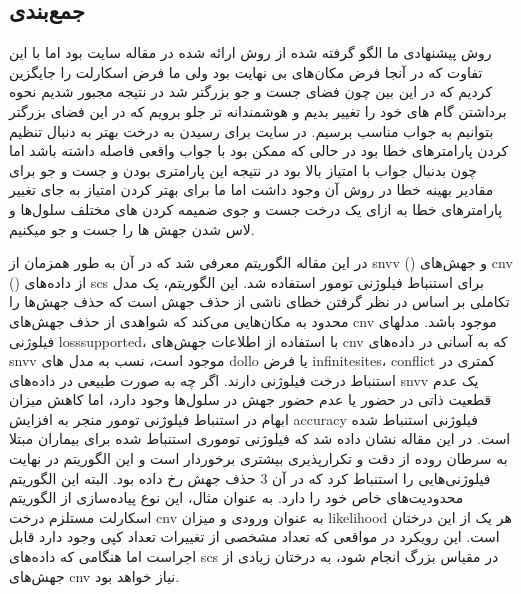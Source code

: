 \subsection{جمع‌بندی}
روش پیشنهادی ما الگو گرفته شده از روش ارائه شده در مقاله سایت بود اما با این تفاوت که در آنجا فرض مکان‌های بی نهایت بود ولی ما فرض اسکارلت را جایگزین کردیم که در این بین چون فضای جست و جو بزرگتر شد در نتیجه مجبور شدیم نحوه برداشتن گام های خود را تغییر بدیم و هوشمندانه تر جلو برویم که در این فضای بزرگتر بتوانیم به جواب مناسب برسیم. در سایت برای رسیدن به درخت بهتر به دنبال تنظیم کردن پارامترهای خطا بود در حالی که ممکن بود با جواب واقعی فاصله داشته باشد اما چون بدنبال جواب با امتیاز بالا بود در نتیجه این پارامتری بودن و جست و جو برای مقادیر بهینه خطا در روش آن وجود داشت اما ما برای بهتر کردن امتیاز به جای تغییر پارامترهای خطا به ازای یک درخت جست و جوی ضمیمه کردن های مختلف سلول‌ها و لاس شدن جهش ها را جست و جو میکنیم.









\newpage

در این مقاله الگوریتم  معرفی شد که در آن به طور همزمان از \gls{snvv} () و جهش‌های \gls{cnv} () از داده‌های \gls{scs} برای استنباط فیلوژنی تومور استفاده شد. این الگوریتم، یک مدل تکاملی بر اساس در نظر گرفتن خطای ناشی از حذف جهش است که حذف جهش‌ها را محدود به مکان‌هایی می‌کند که شواهدی از حذف جهش‌های \gls{cnv} موجود باشد. مدلهای فیلوژنی \gls{losssupported}،  با استفاده از اطلاعات جهش‌های \gls{cnv} که به آسانی در داده‌های \gls{snvv} موجود است، نسب به مدل های \gls{dollo} یا فرض \gls{infinitesites}، \gls{conflict} کمتری در استنباط درخت فیلوژنی دارند. اگر چه به صورت طبیعی در داده‌های \gls{snvv} یک عدم قطعیت ذاتی در حضور یا عدم حضور جهش در سلول‌ها وجود دارد، اما کاهش میزان ابهام در استنباط فیلوژنی تومور منجر به افزایش \gls{accuracy} فیلوژنی استنباط شده است. در این مقاله نشان داده شد که فیلوژنی توموری استنباط شده برای بیماران مبتلا به سرطان روده از دقت و تکرارپذیری بیشتری برخوردار است و این الگوریتم در نهایت فیلوژنی‌هایی را استنباط کرد که در آن 3 حذف جهش رخ داده بود. البته این الگوریتم محدودیت‌های خاص خود را دارد. به عنوان مثال، این نوع پیاده‌سازی از الگوریتم اسکارلت مستلزم درخت \gls{cnv} به عنوان ورودی و میزان \gls{likelihood} هر یک از این درختان است. این رویکرد در مواقعی که تعداد مشخصی از تغییرات تعداد کپی وجود دارد قابل اجراست اما هنگامی که داده‌های \gls{scs} در مقیاس بزرگ انجام شود، به درختان زیادی از جهش‌های \gls{cnv} نیاز خواهد بود. 








